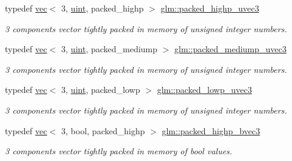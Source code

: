 \begin{DoxyCompactItemize}
\mbox{\label{group__gtc__type__aligned_ga607425d3ca2ad292b115d09aef19e372}} 
typedef \hyperlink{structglm_1_1vec}{vec}$<$ 3, \hyperlink{group__core__precision_ga4fd29415871152bfb5abd588334147c8}{uint}, packed\+\_\+highp $>$ \hyperlink{group__gtc__type__aligned_ga607425d3ca2ad292b115d09aef19e372}{glm\+::packed\+\_\+highp\+\_\+uvec3}
\begin{DoxyCompactList}\small\item\em 3 components vector tightly packed in memory of unsigned integer numbers. \end{DoxyCompactList}\item 
\mbox{\label{group__gtc__type__aligned_gaa79317c123076b994c5c1b46a5b41351}} 
typedef \hyperlink{structglm_1_1vec}{vec}$<$ 3, \hyperlink{group__core__precision_ga4fd29415871152bfb5abd588334147c8}{uint}, packed\+\_\+mediump $>$ \hyperlink{group__gtc__type__aligned_gaa79317c123076b994c5c1b46a5b41351}{glm\+::packed\+\_\+mediump\+\_\+uvec3}
\begin{DoxyCompactList}\small\item\em 3 components vector tightly packed in memory of unsigned integer numbers. \end{DoxyCompactList}\item 
\mbox{\label{group__gtc__type__aligned_ga895469f176463355d8b0a4bd8a4eaf45}} 
typedef \hyperlink{structglm_1_1vec}{vec}$<$ 3, \hyperlink{group__core__precision_ga4fd29415871152bfb5abd588334147c8}{uint}, packed\+\_\+lowp $>$ \hyperlink{group__gtc__type__aligned_ga895469f176463355d8b0a4bd8a4eaf45}{glm\+::packed\+\_\+lowp\+\_\+uvec3}
\begin{DoxyCompactList}\small\item\em 3 components vector tightly packed in memory of unsigned integer numbers. \end{DoxyCompactList}\item 
\mbox{\label{group__gtc__type__aligned_gafad47eaff82deab03a1e8d82d2dbd046}} 
typedef \hyperlink{structglm_1_1vec}{vec}$<$ 3, bool, packed\+\_\+highp $>$ \hyperlink{group__gtc__type__aligned_gafad47eaff82deab03a1e8d82d2dbd046}{glm\+::packed\+\_\+highp\+\_\+bvec3}
\begin{DoxyCompactList}\small\item\em 3 components vector tightly packed in memory of bool values. \end{DoxyCompactList}\item 

\end{DoxyCompactItemize}
